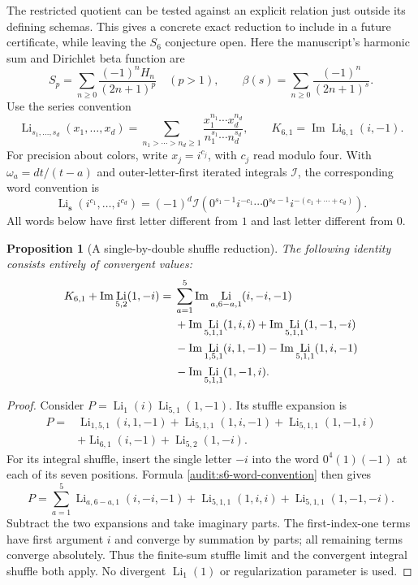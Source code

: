 \documentclass[11pt,a4paper]{article}
\newtheorem{proposition}[theorem]{Proposition}
\theoremstyle{definition}
\theoremstyle{remark}
\DeclareMathOperator{\Li}{Li}
\numberwithin{equation}{section}
\begin{document}
The restricted quotient can be tested against an explicit relation just
outside its defining schemas. This gives a concrete exact reduction to
include in a future certificate, while leaving the $S_6$ conjecture open.
Here the manuscript's harmonic sum and Dirichlet beta function are
\[
 S_p=\sum_{n\ge0}\frac{(-1)^nH_n}{(2n+1)^p}\quad(p>1),
 \qquad
 \beta(s)=\sum_{n\ge0}\frac{(-1)^n}{(2n+1)^s}.
\]
Use the series convention
\[
 \Li_{s_1,\ldots,s_d}(x_1,\ldots,x_d)
 =\sum_{n_1>\cdots>n_d\ge1}
   \frac{x_1^{n_1}\cdots x_d^{n_d}}
        {n_1^{s_1}\cdots n_d^{s_d}},
 \qquad K_{6,1}=\operatorname{Im}\Li_{6,1}(i,-1).
\]
For precision about colors, write $x_j=i^{c_j}$, with $c_j$ read modulo
four. With $\omega_a=dt/(t-a)$ and outer-letter-first iterated integrals
$\mathcal I$, the corresponding word convention is
\begin{equation}
 \Li_{\boldsymbol s}(i^{c_1},\ldots,i^{c_d})
 =(-1)^d\mathcal I\left(
 0^{s_1-1}i^{-c_1}\cdots
 0^{s_d-1}i^{-(c_1+\cdots+c_d)}\right).
 \label{audit:s6-word-convention}
\end{equation}
All words below have first letter different from $1$ and last letter
different from $0$.

\begin{proposition}[A single-by-double shuffle reduction]
\label{audit:s6-depth-three}
The following identity consists entirely of convergent values:
\begin{align}
 K_{6,1}+\operatorname{Im}\Li_{5,2}(1,-i)
 ={}&\sum_{a=1}^{5}
       \operatorname{Im}\Li_{a,6-a,1}(i,-i,-1)\notag\\
 &+\operatorname{Im}\Li_{5,1,1}(1,i,i)
   +\operatorname{Im}\Li_{5,1,1}(1,-1,-i)\notag\\
 &-\operatorname{Im}\Li_{1,5,1}(i,1,-1)
   -\operatorname{Im}\Li_{5,1,1}(1,i,-1)\notag\\
 &-\operatorname{Im}\Li_{5,1,1}(1,-1,i).
 \label{audit:s6-depth-three-identity}
\end{align}
\end{proposition}
\begin{proof}
Consider $P=\Li_1(i)\Li_{5,1}(1,-1)$. Its stuffle expansion is
\begin{align*}
 P={}&\Li_{1,5,1}(i,1,-1)+\Li_{5,1,1}(1,i,-1)
       +\Li_{5,1,1}(1,-1,i)\\
    &+\Li_{6,1}(i,-1)+\Li_{5,2}(1,-i).
\end{align*}
For its integral shuffle, insert the single letter $-i$ into the word
$0^4(1)(-1)$ at each of its seven positions. Formula
\eqref{audit:s6-word-convention} then gives
\[
 P=\sum_{a=1}^{5}\Li_{a,6-a,1}(i,-i,-1)
       +\Li_{5,1,1}(1,i,i)+\Li_{5,1,1}(1,-1,-i).
\]
Subtract the two expansions and take imaginary parts. The first-index-one
terms have first argument $i$ and converge by summation by parts; all
remaining terms converge absolutely. Thus the finite-sum stuffle limit
and the convergent integral shuffle both apply. No divergent
$\Li_1(1)$ or regularization parameter is used.
\end{proof}
\end{document}
